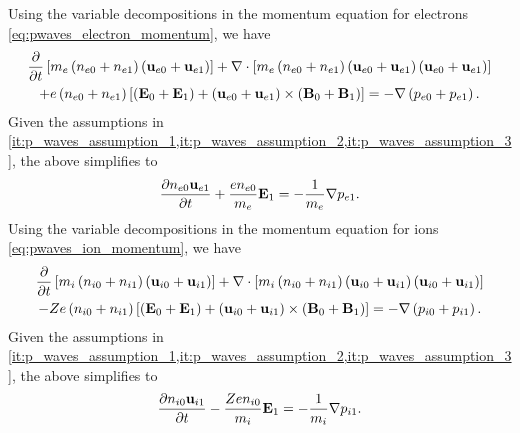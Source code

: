 \documentclass[a4paper,11pt]{report}
\begin{document}
Using the variable decompositions in the momentum equation for electrons \cref{eq:pwaves_electron_momentum}, we have 
\begin{multline*}
    \frac{\partial}{\partial t} \left [ m_e \left ( n_{e0} + n_{e1} \right ) \left ( \mathbf{u}_{e0} + \mathbf{u}_{e1} \right ) \right ] + \nabla \cdot \left [ m_e \left ( n_{e0} + n_{e1} \right ) \left ( \mathbf{u}_{e0} + \mathbf{u}_{e1} \right ) \left ( \mathbf{u}_{e0} + \mathbf{u}_{e1} \right ) \right ] \\
    + e \left ( n_{e0} + n_{e1} \right ) \left [ \left ( \mathbf{E}_0 + \mathbf{E}_1 \right ) + \left ( \mathbf{u}_{e0} + \mathbf{u}_{e1} \right ) \times \left ( \mathbf{B}_0 + \mathbf{B}_1 \right ) \right ] = -\nabla \left ( p_{e0} + p_{e1} \right ).
\end{multline*}
Given the assumptions in \cref{it:p_waves_assumption_1,it:p_waves_assumption_2,it:p_waves_assumption_3}, the above simplifies to
\begin{equation}
    \label{eq:p_waves_e_mom_linearized}
    \frac{\partial n_{e0} \mathbf{u}_{e1}}{\partial t} + \frac{e n_{e0}}{m_e} \mathbf{E}_1 = - \frac{1}{m_e} \nabla p_{e1} .
\end{equation}
Using the variable decompositions in the momentum equation for ions \cref{eq:pwaves_ion_momentum}, we have 
\begin{multline*}
    \frac{\partial}{\partial t} \left [ m_i \left ( n_{i0} + n_{i1} \right ) \left ( \mathbf{u}_{i0} + \mathbf{u}_{i1} \right ) \right ] + \nabla \cdot \left [ m_i \left ( n_{i0} + n_{i1} \right ) \left ( \mathbf{u}_{i0} + \mathbf{u}_{i1} \right ) \left ( \mathbf{u}_{i0} + \mathbf{u}_{i1} \right ) \right ] \\
    - Z e \left ( n_{i0} + n_{i1} \right ) \left [ \left ( \mathbf{E}_0 + \mathbf{E}_1 \right ) + \left ( \mathbf{u}_{i0} + \mathbf{u}_{i1} \right ) \times \left ( \mathbf{B}_0 + \mathbf{B}_1 \right ) \right ] = -\nabla \left ( p_{i0} + p_{i1} \right ).
\end{multline*}
Given the assumptions in \cref{it:p_waves_assumption_1,it:p_waves_assumption_2,it:p_waves_assumption_3}, the above simplifies to
\begin{equation}
    \label{eq:p_waves_i_mom_linearized}
    \frac{\partial n_{i0} \mathbf{u}_{i1}}{\partial t} - \frac{Z e n_{i0}}{m_i} \mathbf{E}_1 = - \frac{1}{m_i}\nabla p_{i1}.
\end{equation}
\end{document}
